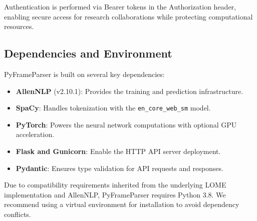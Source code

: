 Authentication is performed via Bearer tokens in the Authorization header, enabling secure access for research collaborations while protecting computational resources.

\subsection{Dependencies and Environment}

PyFrameParser is built on several key dependencies:
\begin{itemize}
    \item \textbf{AllenNLP} (v2.10.1): Provides the training and prediction infrastructure.
    \item \textbf{SpaCy}: Handles tokenization with the \texttt{en\_core\_web\_sm} model.
    \item \textbf{PyTorch}: Powers the neural network computations with optional GPU acceleration.
    \item \textbf{Flask and Gunicorn}: Enable the HTTP API server deployment.
    \item \textbf{Pydantic}: Ensures type validation for API requests and responses.
\end{itemize}

Due to compatibility requirements inherited from the underlying LOME implementation and AllenNLP, PyFrameParser requires Python 3.8. We recommend using a virtual environment for installation to avoid dependency conflicts.
